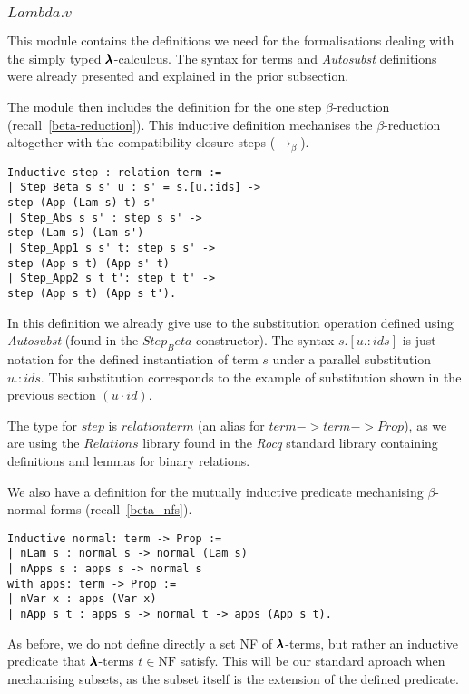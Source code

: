 \subsubsection{\lst$Lambda.v$}

This module contains the definitions we need for the formalisations dealing with the simply typed $\pmb{\lambda}$-calculcus.
The syntax for terms and \textit{Autosubst} definitions were already presented and explained in the prior subsection.

The module then includes the definition for the one step $\beta$-reduction (recall~\cref{beta-reduction}).
This inductive definition mechanises the $\beta$-reduction altogether with the compatibility closure steps ($\to_\beta$).
\begin{lstlisting}[language=Coq]
Inductive step : relation term :=
| Step_Beta s s' u : s' = s.[u.:ids] ->
step (App (Lam s) t) s'
| Step_Abs s s' : step s s' ->
step (Lam s) (Lam s')
| Step_App1 s s' t: step s s' ->
step (App s t) (App s' t)
| Step_App2 s t t': step t t' ->
step (App s t) (App s t').
\end{lstlisting}

In this definition we already give use to the substitution operation defined using \textit{Autosubst} (found in the \lst$Step_Beta$ constructor).
The syntax \lst$s.[u.:ids]$ is just notation for the defined instantiation of term $s$ under a parallel substitution \lst$u.:ids$.
This substitution corresponds to the example of substitution shown in the previous section $(u \cdot id)$.

The type for \lst$step$ is \lst$relation term$ (an alias for \lst$term->term->Prop$), as we are using the \lst$Relations$ library found in the \textit{Rocq} standard library containing definitions and lemmas for binary relations.

We also have a definition for the mutually inductive predicate mechanising $\beta$-normal forms (recall~\cref{beta_nfs}).
\begin{lstlisting}[language=Coq]
Inductive normal: term -> Prop :=
| nLam s : normal s -> normal (Lam s)
| nApps s : apps s -> normal s  
with apps: term -> Prop :=
| nVar x : apps (Var x)
| nApp s t : apps s -> normal t -> apps (App s t).
\end{lstlisting}

As before, we do not define directly a set NF of $\pmb{\lambda}$-terms, but rather an inductive predicate that $\pmb{\lambda}$-terms $t \in \text{NF}$ satisfy.
This will be our standard aproach when mechanising subsets, as the subset itself is the extension of the defined predicate.

